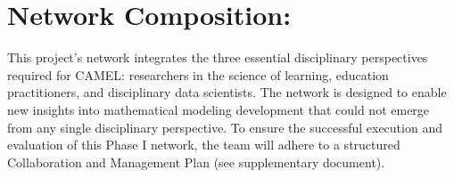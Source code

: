 \documentclass[11pt]{article}
\begin{document}

\section{Network Composition:}

This project's network integrates the three essential disciplinary perspectives required for CAMEL: researchers in the science of learning, education practitioners, and disciplinary data scientists.
The network is designed to enable new insights into mathematical modeling development that could not emerge from any single disciplinary perspective.
To ensure the successful execution and evaluation of this Phase I network, the team will adhere to a structured Collaboration and Management Plan (see supplementary document).

         
\end{document}
